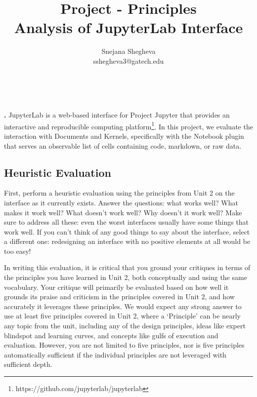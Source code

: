\documentclass[12pt,letterpaper]{article}
\makeatletter
\renewcommand{\maketitle}{\bgroup
   \begin{center}
   \textbf{{\fontsize{18pt}{20}\selectfont \@title}}\\
   \vspace{10pt}
   {\fontsize{12pt}{0}\selectfont \@author} 
   \end{center}
}
\newenvironment{myquote}[1]%
  {\list{}{\leftmargin=#1\rightmargin=#1}\item[]}%
  {\endlist}
\renewenvironment{abstract}
{\vspace*{-.5in}\fontsize{12pt}{12}\begin{myquote}{.5in}
\noindent \par{\bfseries \abstractname.}}
{\medskip\noindent
\end{myquote}
}
\makeatother
\begin{document}
\title{Project - Principles\\Analysis of JupyterLab Interface}
\author{Snejana Shegheva \\ sshegheva3@gatech.edu}

\maketitle
\thispagestyle{fancy}

\begin{abstract}
JupyterLab is a web-based interface for Project Jupyter that provides an interactive and reproducible computing platform\footnote{https://github.com/jupyterlab/jupyterlab}. In this project, we evaluate the interaction with Documents and Kernels, specifically with the Notebook plugin that serves an observable list of cells containing code, markdown, or raw data.  
\end{abstract}

\subsection*{Heuristic Evaluation}

First, perform a heuristic evaluation using the principles from Unit 2 on the interface as it currently exists. Answer the questions: what works well? What makes it work well? What doesn’t work well? Why doesn’t it work well? Make sure to address all these: even the worst interfaces usually have some things that work well. If you can’t think of any good things to say about the interface, select a different one: redesigning an interface with no positive elements at all would be too easy!

In writing this evaluation, it is critical that you ground your critiques in terms of the principles you have learned in Unit 2, both conceptually and using the same vocabulary. Your critique will primarily be evaluated based on how well it grounds its praise and criticism in the principles covered in Unit 2, and how accurately it leverages these principles. We would expect any strong answer to use at least five principles covered in Unit 2, where a ‘Principle’ can be nearly any topic from the unit, including any of the design principles, ideas like expert blindspot and learning curves, and concepts like gulfs of execution and evaluation. However, you are not limited to five principles, nor is five principles automatically sufficient if the individual principles are not leveraged with sufficient depth.
\end{document}
